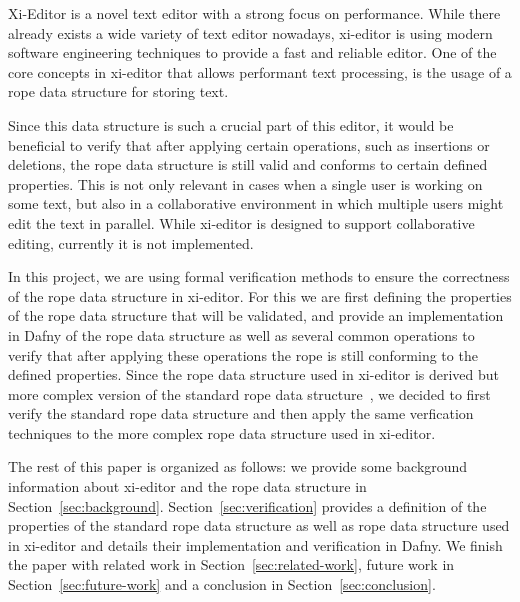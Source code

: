 Xi-Editor is a novel text editor with a strong focus on performance.
While there already exists a wide variety of text editor nowadays, xi-editor is using modern software engineering techniques to provide a fast and reliable editor.
One of the core concepts in xi-editor that allows performant text processing, is the usage of a rope data structure for storing text.

Since this data structure is such a crucial part of this editor, it would be beneficial to verify that after applying certain operations, such as insertions or deletions, the rope data structure is still valid and conforms to certain defined properties.
This is not only relevant in cases when a single user is working on some text, but also in a collaborative environment in which multiple users might edit the text in parallel.
While xi-editor is designed to support collaborative editing, currently it is not implemented.

In this project, we are using formal verification methods to ensure the correctness of the rope data structure in xi-editor.
For this we are first defining the properties of the rope data structure that will be validated, and provide an implementation in Dafny of the rope data structure as well as several common operations to verify that after applying these operations the rope is still conforming to the defined properties.
Since the rope data structure used in xi-editor is derived but more complex version of the standard rope data structure~\cite{boehm1995ropes}, we decided to first verify the standard rope data structure and then apply the same verfication techniques to the more complex rope data structure used in xi-editor.

The rest of this paper is organized as follows: we provide some background information about xi-editor and the rope data structure in Section~\ref{sec:background}.
Section~\ref{sec:verification} provides a definition of the properties of the standard rope data structure as well as rope data structure used in xi-editor and details their implementation and verification in Dafny. 
We finish the paper with related work in Section~\ref{sec:related-work}, future work in Section~\ref{sec:future-work} and a conclusion in Section~\ref{sec:conclusion}.
